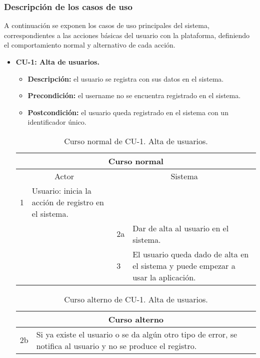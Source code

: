 \subsubsection{Descripción de los casos de uso}
A continuación se exponen los casos de uso principales del sistema, correspondientes a las acciones básicas del usuario con la plataforma, definiendo el comportamiento normal y alternativo de cada acción.

\begin{itemize}
	\item \textbf{CU-1: Alta de usuarios.}
	\begin{itemize}
		\item \textbf{Descripción:} el usuario se registra con sus datos en el sistema.
		\item \textbf{Precondición:} el username no se encuentra registrado en el sistema.
		\item \textbf{Postcondición:} el usuario queda registrado en el sistema con un identificador único.
	\end{itemize}
	\begin{table}[H]
		\centering
		\begin{tabular}{|p{0.3cm}|p{5cm}|p{0.3cm}|p{5cm}|}
			\hline
			\multicolumn{4}{|c|}{Curso normal} \\ \hline
			\multicolumn{2}{|c|}{Actor} & \multicolumn{2}{|c|}{Sistema} \\ \hline
			1 & Usuario: inicia la acción de registro en el sistema. &  &  \\ \hline
			  &  & 2a & Dar de alta al usuario en el sistema. \\ \hline
			  &  & 3 & El usuario queda dado de alta en el sistema y puede empezar a usar la aplicación. \\ \hline
		\end{tabular}
		\caption{Curso normal de CU-1. Alta de usuarios.}
		\label{tabla:cu1-normal}
	\end{table}
	
	\begin{table}[H]
		\centering
		\begin{tabular}{|p{0.3cm}|p{10cm}|}
			\hline
			\multicolumn{2}{|c|}{Curso alterno} \\ \hline
			2b & Si ya existe el usuario o se da algún otro tipo de error, se notifica al usuario y no se produce el registro. \\ \hline
		\end{tabular}
		\caption{Curso alterno de CU-1. Alta de usuarios.}
		\label{tabla:cu1-alterno}
	\end{table}
\end{itemize}

